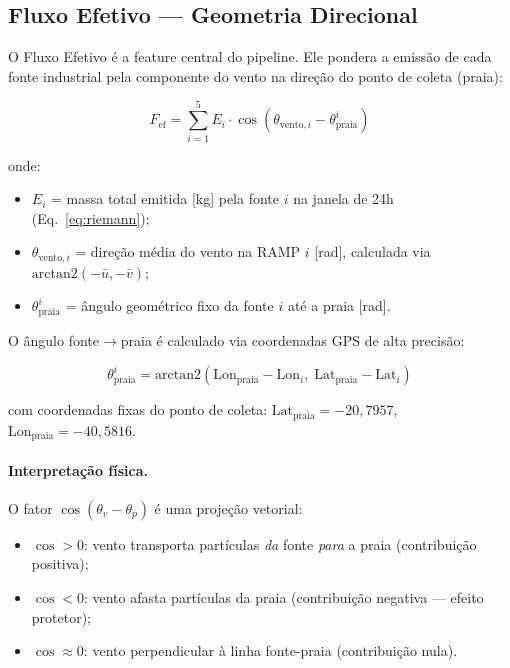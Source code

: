 \documentclass[12pt, a4paper]{article}
\begin{document}
\subsection{Fluxo Efetivo --- Geometria Direcional}
\label{subsec:fluxo_efetivo}

O Fluxo Efetivo é a feature central do pipeline. Ele pondera a emissão
de cada fonte industrial pela componente do vento na direção do ponto
de coleta (praia):

\begin{equation}
    F_{\text{ef}} = \sum_{i=1}^{5} E_i \cdot \cos\!\left(
        \theta_{\text{vento},i} - \theta_{\text{praia}}^{i}\right)
    \label{eq:fluxo_efetivo}
\end{equation}

onde:
\begin{itemize}[noitemsep]
    \item $E_i$ = massa total emitida [\si{kg}] pela fonte $i$ na janela
          de 24h (Eq.~\ref{eq:riemann});
    \item $\theta_{\text{vento},i}$ = direção média do vento na RAMP $i$
          [\si{rad}], calculada via $\text{arctan2}(-\bar{u}, -\bar{v})$;
    \item $\theta_{\text{praia}}^{i}$ = ângulo geométrico fixo da fonte
          $i$ até a praia [\si{rad}].
\end{itemize}

O ângulo fonte$\to$praia é calculado via coordenadas GPS de alta
precisão:

\begin{equation}
    \theta_{\text{praia}}^{i} = \text{arctan2}\!\left(
        \text{Lon}_{\text{praia}} - \text{Lon}_i,\;
        \text{Lat}_{\text{praia}} - \text{Lat}_i
    \right)
    \label{eq:angulo_praia}
\end{equation}

com coordenadas fixas do ponto de coleta:
$\text{Lat}_{\text{praia}} = -20{,}7957$,
$\text{Lon}_{\text{praia}} = -40{,}5816$.

\paragraph{Interpretação física.}
O fator $\cos(\theta_v - \theta_p)$ é uma projeção vetorial:
\begin{itemize}[noitemsep]
    \item $\cos > 0$: vento transporta partículas \textit{da} fonte
          \textit{para} a praia (contribuição positiva);
    \item $\cos < 0$: vento afasta partículas da praia (contribuição
          negativa --- efeito protetor);
    \item $\cos \approx 0$: vento perpendicular à linha fonte-praia
          (contribuição nula).
\end{itemize}
\end{document}
